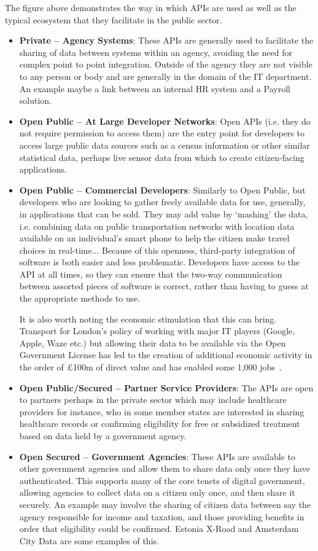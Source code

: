 The figure above demonstrates the way in which APIs are used as well as the typical
ecosystem that they facilitate in the public sector.
\begin{itemize}
	\item \textbf{Private – Agency Systems}: These APIs are generally used to facilitate
	 the sharing of data between systems within an agency, avoiding the need
	 for complex point to point integration. Outside of the agency they are not visible
	 to any person or body and are generally in the domain of the IT
	 department. An example maybe a link between an internal HR system and a
	 Payroll solution.
	 \item \textbf{Open Public – At Large Developer Networks}: Open APIs (i.e. they do
	 not require permission to access them) are the entry point for developers
	 to access large public data sources such as a census information or other
	 similar statistical data, perhaps live sensor data from which to create
	 citizen-facing applications.
	 \item \textbf{Open Public – Commercial Developers}: Similarly to Open Public,
	 but developers who are
	 looking to gather freely available data for use, generally, in applications
	 that can be sold. They may add value by ‘mashing’ the data, i.e. combining
	 data on public transportation networks with location data available on an
	 individual’s smart phone to help the citizen make travel choices in real-time...
	 Because of this openness, third-party integration of software is  both easier
	 and less problematic. Developers have access to the API at all times, so they
	 can ensure that the two-way communication between assorted pieces of software
	 is correct, rather than having to guess at the appropriate methods to use.
	 
	 It is also worth noting the economic stimulation that this can bring. Transport
	 for London’s policy of working with major IT players (Google, Apple, Waze etc.)
	 but allowing their data to be available via the Open Government License has led
	 to the creation of additional economic activity in the order of £100m of direct
	 value and has enabled some 1,000 jobs~\citep{api_industrial_data}.
	 \item \textbf{Open Public/Secured – Partner Service Providers}: The APIs are open to
	 partners perhaps in the private sector which may include healthcare providers
	 for instance, who in some member states are interested in sharing healthcare
	 records or confirming eligibility for free or subsidized treatment based on
	 data held by a government agency.
	 \item \textbf{Open Secured – Government Agencies}: These APIs are available to other
	 government agencies and allow them to share data only once they have
	 authenticated. This supports many of the core tenets of digital government,
	 allowing agencies to collect data on a citizen only once, and then share it
	 securely. An example may involve the sharing of citizen data between say the
	 agency responsible for income and taxation, and those providing benefits in
	 order that eligibility could be confirmed. Estonia X-Road and Amsterdam City
	 Data are some examples of this.
	 

\end{itemize}
